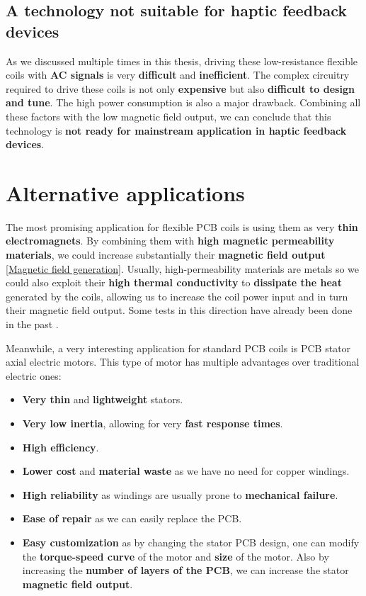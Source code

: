 \subsection{A technology not suitable for haptic feedback devices}
As we discussed multiple times in this thesis, driving these low-resistance flexible coils with \textbf{AC signals} is very \textbf{difficult} and \textbf{inefficient}.
The complex circuitry required to drive these coils is not only \textbf{expensive} but also \textbf{difficult to design and tune}.
The high power consumption is also a major drawback.
Combining all these factors with the low magnetic field output, we can conclude that this technology is \textbf{not ready for mainstream application in haptic feedback devices}.

\section{Alternative applications}
The most promising application for flexible PCB coils is using them as very \textbf{thin electromagnets}.
By combining them with \textbf{high magnetic permeability materials}, we could increase substantially their \textbf{magnetic field output} \ref{Magnetic field generation}.
Usually, high-permeability materials are metals so we could also exploit their \textbf{high thermal conductivity} to \textbf{dissipate the heat} generated by the coils, allowing us to increase the coil power input and in turn their magnetic field output.
Some tests in this direction have already been done in the past \cite{Flexar_as_electromagnets}.

Meanwhile, a very interesting application for standard PCB coils is PCB stator axial electric motors.
This type of motor has multiple advantages over traditional electric ones:
\begin{itemize}
    \item \textbf{Very thin} and \textbf{lightweight} stators.
    \item \textbf{Very low inertia}, allowing for very \textbf{fast response times}.
    \item \textbf{High efficiency}.
    \item \textbf{Lower cost} and \textbf{material waste} as we have no need for copper windings.
    \item \textbf{High reliability} as windings are usually prone to \textbf{mechanical failure}.
    \item \textbf{Ease of repair} as we can easily replace the PCB.
    \item \textbf{Easy customization} as by changing the stator PCB design, one can modify the \textbf{torque-speed curve} of the motor and \textbf{size} of the motor. Also by increasing the \textbf{number of layers of the PCB}, we can increase the stator \textbf{magnetic field output}.
\end{itemize}

